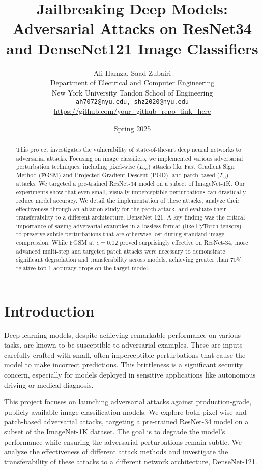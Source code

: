 \documentclass[letterpaper]{article}
\title{Jailbreaking Deep Models: Adversarial Attacks on ResNet34 and DenseNet121 Image Classifiers}
\author{Ali Hamza, Saad Zubairi \\
Department of Electrical and Computer Engineering\\
New York University Tandon School of Engineering\\
\texttt{ah7072@nyu.edu, shz2020@nyu.edu}\\
\url{https://github.com/your\_github\_repo\_link\_here} %
}
\date{Spring 2025} %
\begin{document}
\maketitle

\begin{abstract}
This project investigates the vulnerability of state-of-the-art deep neural networks to adversarial attacks. Focusing on image classifiers, we implemented various adversarial perturbation techniques, including pixel-wise ($L_\infty$) attacks like Fast Gradient Sign Method (FGSM) and Projected Gradient Descent (PGD), and patch-based ($L_0$) attacks. We targeted a pre-trained ResNet-34 model on a subset of ImageNet-1K. Our experiments show that even small, visually imperceptible perturbations can drastically reduce model accuracy. We detail the implementation of these attacks, analyze their effectiveness through an ablation study for the patch attack, and evaluate their transferability to a different architecture, DenseNet-121. A key finding was the critical importance of saving adversarial examples in a lossless format (like PyTorch tensors) to preserve subtle perturbations that are otherwise lost during standard image compression. While FGSM at $\epsilon=0.02$ proved surprisingly effective on ResNet-34, more advanced multi-step and targeted patch attacks were necessary to demonstrate significant degradation and transferability across models, achieving greater than 70\% relative top-1 accuracy drops on the target model.
\end{abstract}


\section{Introduction}
Deep learning models, despite achieving remarkable performance on various tasks, are known to be susceptible to adversarial examples. These are inputs carefully crafted with small, often imperceptible perturbations that cause the model to make incorrect predictions. This brittleness is a significant security concern, especially for models deployed in sensitive applications like autonomous driving or medical diagnosis.

This project focuses on launching adversarial attacks against production-grade, publicly available image classification models. We explore both pixel-wise and patch-based adversarial attacks, targeting a pre-trained ResNet-34 model on a subset of the ImageNet-1K dataset. The goal is to degrade the model's performance while ensuring the adversarial perturbations remain subtle. We analyze the effectiveness of different attack methods and investigate the transferability of these attacks to a different network architecture, DenseNet-121.
\end{document}
